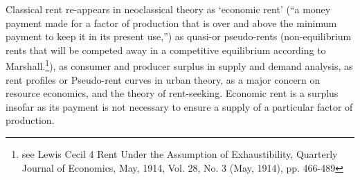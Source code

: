 



% 




Classical rent re-appears in neoclassical theory as `economic rent' (``a money payment made for a factor of production that is over and above the minimum payment to keep it in its present use,'')  as quasi-or pseudo-rents (non-equilibrium rents that will be competed away in a competitive equilibrium according to Marshall.\footnote{see Lewis Cecil 4 Rent Under the Assumption of Exhaustibility, Quarterly Journal of Economics, May, 1914, Vol. 28, No. 3 (May, 1914), pp. 466-489}),  as consumer  and producer surplus in supply and demand analysis,  as rent profiles or Pseudo-rent curves in urban theory, as a major concern on resource economics, and the theory of rent-seeking. Economic rent is a surplus insofar as its payment is not necessary to ensure a supply of a particular factor of production. 


